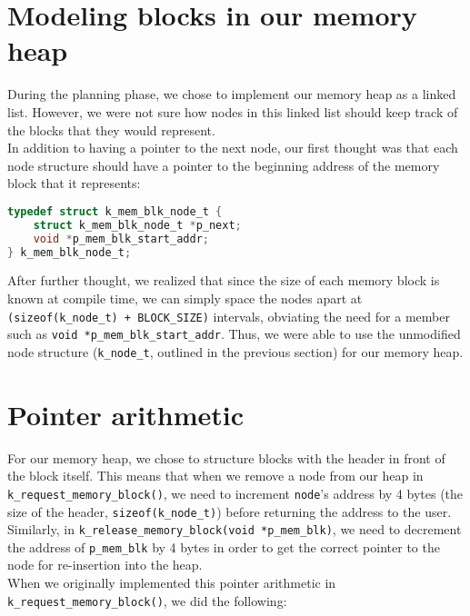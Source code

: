 \documentclass[12pt]{report}
\begin{document}
\section{Modeling blocks in our memory heap}

During the planning phase, we chose to implement our memory heap as a linked list. However, we were not sure how nodes in this linked list should keep track of the blocks that they would represent.\\

In addition to having a pointer to the next node, our first thought was that each node structure should have a pointer to the beginning address of the memory block that it represents:

\begin{minipage}{\textwidth}
\begin{lstlisting}[language=C]
typedef struct k_mem_blk_node_t {
    struct k_mem_blk_node_t *p_next;
    void *p_mem_blk_start_addr;
} k_mem_blk_node_t;
\end{lstlisting}
\end{minipage}

After further thought, we realized that since the size of each memory block is known at compile time, we can simply space the nodes apart at \texttt{(sizeof(k_node_t) + BLOCK_SIZE)} intervals, obviating the need for a member such as \texttt{void *p_mem_blk_start_addr}. Thus, we were able to use the unmodified node structure (\texttt{k_node_t}, outlined in the previous section) for our memory heap.

\section{Pointer arithmetic}

For our memory heap, we chose to structure blocks with the header in front of the block itself. This means that when we remove a node from our heap in \texttt{k_request_memory_block()}, we need to increment \texttt{node}'s address by 4 bytes (the size of the header, \texttt{sizeof(k_node_t)}) before returning the address to the user. Similarly, in \texttt{k_release_memory_block(void *p_mem_blk)}, we need to decrement the address of \texttt{p_mem_blk} by 4 bytes in order to get the correct pointer to the node for re-insertion into the heap.\\

When we originally implemented this pointer arithmetic in \texttt{k_request_memory_block()}, we did the following:
\end{document}
